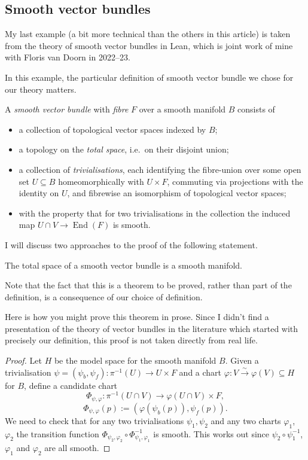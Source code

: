 \documentclass[runningheads]{llncs}
\begin{document}
\subsection{Smooth vector bundles}

My last example (a bit more technical than the others in this article)
is taken from the theory of smooth vector bundles in Lean,
which is joint work of mine with Floris van Doorn in 2022--23.

In this example, the particular definition of smooth vector bundle we chose for our theory matters.

\begin{definition}
A \emph{smooth vector bundle} with \emph{fibre} $F$ over a smooth manifold $B$ consists of
\begin{itemize}
  \item a collection of topological vector spaces indexed by $B$;
  \item a topology on the \emph{total space}, i.e.\ on their disjoint union;
  \item a collection of \emph{trivialisations}, each identifying the fibre-union over some open set
  $U\subseteq B$ homeomorphically with $U\times F$, commuting via projections with the identity on
  $U$, and fibrewise an isomorphism of topological vector spaces;
  \item with the property that for two trivialisations in the collection the induced map
  $U\cap V \to \operatorname{End}(F)$ is smooth.
\end{itemize}
\end{definition}

I will discuss two approaches to the proof of the following statement.

\begin{proposition}
  The total space of a smooth vector bundle is a smooth manifold.
\end{proposition}


Note that the fact that this is a theorem to be proved, rather than part of the definition,
is a consequence of our choice of definition.

Here is how you might prove this theorem in prose.
Since I didn't find a presentation of the theory of vector bundles in the literature
which started with precisely our definition,
this proof is not taken directly from real life.

\begin{proof}
Let $H$ be the model space for the smooth manifold $B$.  Given a trivialisation
$\psi =(\psi_b,\psi_f): \pi^{-1}(U)\to U \times F$ and a chart
$\varphi : V \mathrel{\overset{\sim}{\to}} \varphi(V)\subseteq H$ for $B$, define a candidate chart
\[
  \Phi_{\psi,\varphi}:\pi^{-1}(U\cap V) \to \varphi(U \cap V) \times F,
\]
\[
  \Phi_{\psi,\varphi}(p) := (\varphi(\psi_b(p)), \psi_f(p)).
\]
We need to check that for any two trivialisations $\psi_1, \psi_2$ and any two charts $\varphi_1$,
$\varphi_2$ the transition function $\Phi_{\psi_2,\varphi_2} \circ \Phi_{\psi_1,\varphi_1}^{-1}$ is
smooth.  This works out since $\psi_2\circ\psi_1^{-1}$, $\varphi_1$ and $\varphi_2$ are all smooth.
\end{proof}
\end{document}

